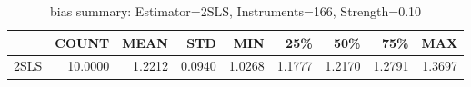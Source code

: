 \begin{table}[ht]
\centering
\caption{bias summary: Estimator=2SLS, Instruments=166, Strength=0.10}
\begin{tabular}{lrrrrrrrr}
\toprule
 & COUNT & MEAN & STD & MIN & 25\% & 50\% & 75\% & MAX \\
\midrule
2SLS & 10.0000 & 1.2212 & 0.0940 & 1.0268 & 1.1777 & 1.2170 & 1.2791 & 1.3697 \\
\bottomrule
\end{tabular}
\end{table}
